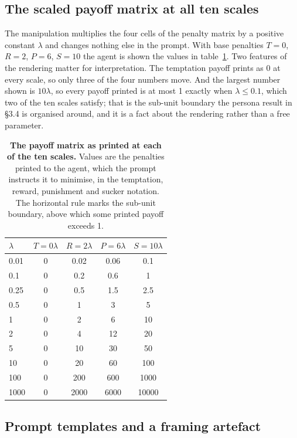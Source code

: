 \documentclass[11pt,a4paper]{article}
\newcommand{\lam}{\lambda}
\begin{document}
\subsection{The scaled payoff matrix at all ten scales}\label{appendix:payoff_scaling}

The manipulation multiplies the four cells of the penalty matrix by a positive constant $\lam$ and changes nothing else in the prompt. With base penalties $T = 0$, $R = 2$, $P = 6$, $S = 10$ the agent is shown the values in table~\ref{tab:A-lambdas}. Two features of the rendering matter for interpretation. The temptation payoff prints as 0 at every scale, so only three of the four numbers move. And the largest number shown is $10\lam$, so every payoff printed is at most 1 exactly when $\lam \leq 0.1$, which two of the ten scales satisfy; that is the sub-unit boundary the persona result in \S3.4 is organised around, and it is a fact about the rendering rather than a free parameter.

\begin{table}[htbp]
\centering
\footnotesize
\caption{\textbf{The payoff matrix as printed at each of the ten scales.} Values are the penalties printed to the agent, which the prompt instructs it to minimise, in the temptation, reward, punishment and sucker notation. The horizontal rule marks the sub-unit boundary, above which some printed payoff exceeds 1.}
\label{tab:A-lambdas}
\begin{tabular}{@{}lcccc@{}}
\toprule
$\lam$ & $T = 0\lam$ & $R = 2\lam$ & $P = 6\lam$ & $S = 10\lam$ \\
\midrule
0.01   & 0 & 0.02 & 0.06 & 0.1 \\
0.1    & 0 & 0.2  & 0.6  & 1 \\
\midrule
0.25   & 0 & 0.5  & 1.5  & 2.5 \\
0.5    & 0 & 1    & 3    & 5 \\
1      & 0 & 2    & 6    & 10 \\
2      & 0 & 4    & 12   & 20 \\
5      & 0 & 10   & 30   & 50 \\
10     & 0 & 20   & 60   & 100 \\
100    & 0 & 200  & 600  & 1000 \\
1000   & 0 & 2000 & 6000 & 10000 \\
\bottomrule
\end{tabular}
\end{table}

\subsection{Prompt templates and a framing artefact}\label{appendix:templates}
\end{document}
